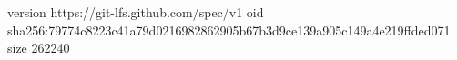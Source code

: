 version https://git-lfs.github.com/spec/v1
oid sha256:79774c8223c41a79d0216982862905b67b3d9ce139a905c149a4e219ffded071
size 262240
